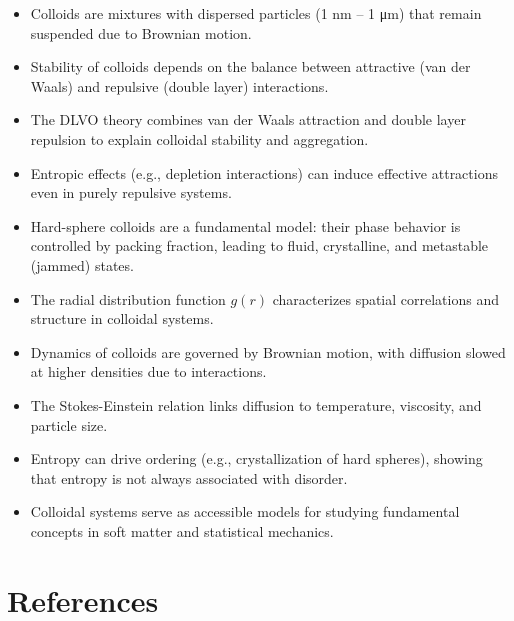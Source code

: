 \documentclass[
  letterpaper,
  enabledeprecatedfontcommands]{report}
\providecommand{\tightlist}{%
  \setlength{\itemsep}{0pt}\setlength{\parskip}{0pt}}
\begin{document}
\begin{tcolorbox}[enhanced jigsaw, leftrule=.75mm, bottomrule=.15mm, toprule=.15mm, colbacktitle=quarto-callout-important-color!10!white, title=\textcolor{quarto-callout-important-color}{\faExclamation}\hspace{0.5em}{Check your understanding}, breakable, titlerule=0mm, opacitybacktitle=0.6, colback=white, coltitle=black, colframe=quarto-callout-important-color-frame, bottomtitle=1mm, rightrule=.15mm, toptitle=1mm, left=2mm, opacityback=0, arc=.35mm]

\begin{itemize}
\tightlist
\item
  Colloids are mixtures with dispersed particles (1 nm -- 1 μm) that
  remain suspended due to Brownian motion.
\item
  Stability of colloids depends on the balance between attractive (van
  der Waals) and repulsive (double layer) interactions.
\item
  The DLVO theory combines van der Waals attraction and double layer
  repulsion to explain colloidal stability and aggregation.
\item
  Entropic effects (e.g., depletion interactions) can induce effective
  attractions even in purely repulsive systems.
\item
  Hard-sphere colloids are a fundamental model: their phase behavior is
  controlled by packing fraction, leading to fluid, crystalline, and
  metastable (jammed) states.
\item
  The radial distribution function \(g(r)\) characterizes spatial
  correlations and structure in colloidal systems.
\item
  Dynamics of colloids are governed by Brownian motion, with diffusion
  slowed at higher densities due to interactions.
\item
  The Stokes-Einstein relation links diffusion to temperature,
  viscosity, and particle size.
\item
  Entropy can drive ordering (e.g., crystallization of hard spheres),
  showing that entropy is not always associated with disorder.
\item
  Colloidal systems serve as accessible models for studying fundamental
  concepts in soft matter and statistical mechanics.
\end{itemize}

\end{tcolorbox}

\section*{References}\label{references}
\end{document}
